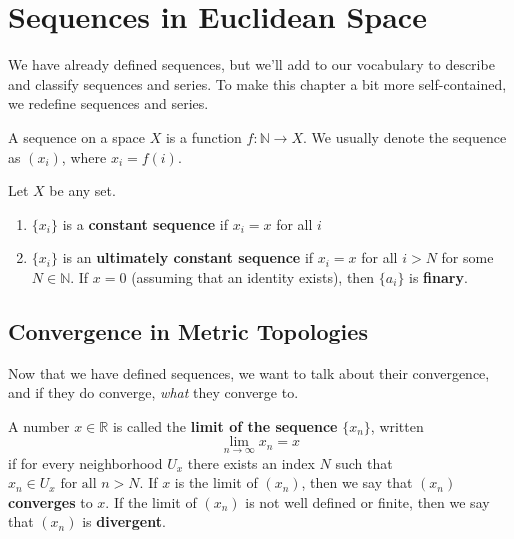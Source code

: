 \section{Sequences in Euclidean Space} 

  We have already defined sequences, but we'll add to our vocabulary to describe and classify sequences and series. To make this chapter a bit more self-contained, we redefine sequences and series. 

  \begin{definition}[Sequence]
    A sequence on a space $X$ is a function $f: \mathbb{N} \rightarrow X$. We usually denote the sequence as $(x_i)$, where $x_i = f(i)$. 
  \end{definition}

  \begin{definition}
    Let $X$ be any set. 
    \begin{enumerate}
      \item $\{x_i\}$ is a \textbf{constant sequence} if $x_i = x$ for all $i$
      \item $\{x_i\}$ is an \textbf{ultimately constant sequence} if $x_i = x$ for all $i > N$ for some $N \in \mathbb{N}$. If $x = 0$ (assuming that an identity exists), then $\{a_i\}$ is \textbf{finary}.
    \end{enumerate}
  \end{definition}

\subsection{Convergence in Metric Topologies}

  Now that we have defined sequences, we want to talk about their convergence, and if they do converge, \textit{what} they converge to. 

  \begin{definition}
    A number $x \in \mathbb{R}$ is called the \textbf{limit of the sequence} $\{x_n\}$, written 
    \begin{equation}
      \lim_{n \rightarrow \infty} x_n = x
    \end{equation}
    if for every neighborhood $U_x$ there exists an index $N$ such that $x_n \in U_x \text{ for all } n > N$. If $x$ is the limit of $(x_n)$, then we say that $(x_n)$ \textbf{converges} to $x$. If the limit of $(x_n)$ is not well defined or finite, then we say that $(x_n)$ is \textbf{divergent}. 
  \end{definition}


